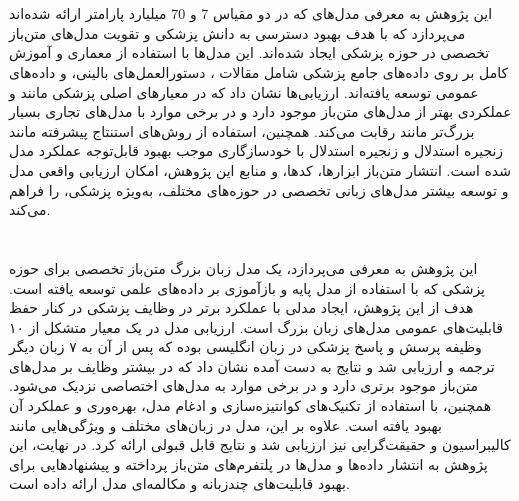 \documentclass[11pt, a4paper, oneside]{book}
\begin{document}
		\section{}
			این پژوهش به معرفی مدل‌های  که در دو مقیاس 7 و 70 میلیارد پارامتر ارائه شده‌اند می‌پردازد که با هدف بهبود دسترسی به دانش پزشکی و تقویت مدل‌های متن‌باز تخصصی در حوزه پزشکی ایجاد شده‌اند. این مدل‌ها با استفاده از معماری  و آموزش کامل بر روی داده‌های جامع پزشکی شامل مقالات ، دستورالعمل‌های بالینی، و داده‌های عمومی توسعه یافته‌اند. ارزیابی‌ها نشان داد که  در معیارهای اصلی پزشکی مانند  و  عملکردی بهتر از مدل‌های متن‌باز موجود دارد و در برخی موارد با مدل‌های تجاری بسیار بزرگ‌تر مانند  رقابت می‌کند. همچنین، استفاده از روش‌های استنتاج پیشرفته مانند زنجیره استدلال  و زنجیره استدلال با خودسازگاری  موجب بهبود قابل‌توجه عملکرد مدل شده است. انتشار متن‌باز ابزارها، کدها، و منابع این پژوهش، امکان ارزیابی واقعی مدل و توسعه بیشتر مدل‌های زبانی تخصصی در حوزه‌های مختلف، به‌ویژه پزشکی، را فراهم می‌کند. \cite{chen_meditron-70b_2023}
	
		\section{}
			این پژوهش به معرفی  می‌پردازد، یک مدل زبان بزرگ متن‌باز تخصصی برای حوزه پزشکی که با استفاده از مدل پایه  و بازآموزی بر داده‌های علمی  توسعه یافته است. هدف از این پژوهش، ایجاد مدلی با عملکرد برتر در وظایف پزشکی در کنار حفظ قابلیت‌های عمومی مدل‌های زبان بزرگ است. ارزیابی مدل در یک معیار متشکل از ۱۰ وظیفه پرسش و پاسخ پزشکی در زبان انگلیسی بوده که پس از آن به ۷ زبان دیگر ترجمه و ارزیابی شد و نتایج به دست آمده نشان داد که  در بیشتر وظایف بر مدل‌های متن‌باز موجود برتری دارد و در برخی موارد به مدل‌های اختصاصی نزدیک می‌شود. همچنین، با استفاده از تکنیک‌های کوانتیزه‌سازی و ادغام مدل، بهره‌وری و عملکرد آن بهبود یافته است. علاوه بر این، مدل در زبان‌های مختلف و ویژگی‌هایی مانند کالیبراسیون و حقیقت‌گرایی نیز ارزیابی شد و نتایج قابل قبولی ارائه کرد. در نهایت، این پژوهش به انتشار داده‌ها و مدل‌ها در پلتفرم‌های متن‌باز پرداخته و پیشنهادهایی برای بهبود قابلیت‌های چندزبانه و مکالمه‌ای مدل ارائه داده است. \cite{labrak_biomistral_2024}
		
\end{document}
